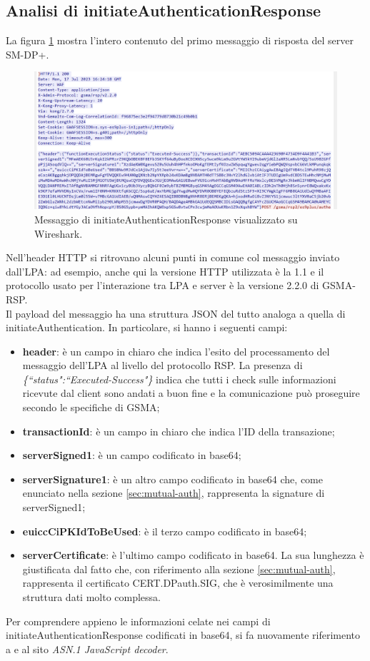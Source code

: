 \documentclass[10pt, oneside]{book}
\begin{document}
\subsection{Analisi di initiateAuthenticationResponse}
La figura \ref{fig:msg2-stream-pcap} mostra l'intero contenuto del primo messaggio di risposta del server SM-DP+.\\
\begin{figure}
\includegraphics[width=\linewidth]{msg2-stream-pcap.png}
\caption{Messaggio di initiateAuthenticationResponse visualizzato su Wireshark.}
\label{fig:msg2-stream-pcap}
\end{figure}
Nell'header HTTP si ritrovano alcuni punti in comune col messaggio inviato dall'LPA: ad esempio, anche qui la versione HTTP utilizzata è la 1.1 e il protocollo usato per l'interazione tra LPA e server è la versione 2.2.0 di GSMA-RSP.\\

Il payload del messaggio ha una struttura JSON del tutto analoga a quella di initiateAuthentication. In particolare, si hanno i seguenti campi:
\begin{itemize}
\item \textbf{header}: è un campo in chiaro che indica l'esito del processamento del messaggio dell'LPA al livello del protocollo RSP. La presenza di \textit{\{``status":``Executed-Success"\}} indica che tutti i check sulle informazioni ricevute dal client sono andati a buon fine e la comunicazione può proseguire secondo le specifiche di GSMA;
\item \textbf{transactionId}: è un campo in chiaro che indica l'ID della transazione;
\item \textbf{serverSigned1}: è un campo codificato in base64;
\item \textbf{serverSignature1}: è un altro campo codificato in base64 che, come enunciato nella sezione \ref{sec:mutual-auth}, rappresenta la signature di serverSigned1;
\item \textbf{euiccCiPKIdToBeUsed}: è il terzo campo codificato in base64;
\item \textbf{serverCertificate}: è l'ultimo campo codificato in base64. La sua lunghezza è giustificata dal fatto che, con riferimento alla sezione \ref{sec:mutual-auth}, rappresenta il certificato CERT.DPauth.SIG, che è verosimilmente una struttura dati molto complessa.
\end{itemize}
Per comprendere appieno le informazioni celate nei campi di initiateAuthenticationResponse codificati in base64, si fa nuovamente riferimento a \cite{RSP-definitions} e al sito \textit{ASN.1 JavaScript decoder}.\\
\end{document}
